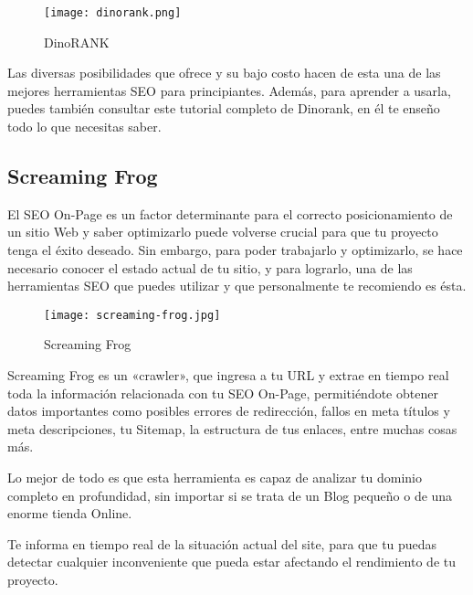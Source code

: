 \begin{figure}[ht!]
    \texttt{[image: dinorank.png]}
    \caption{DinoRANK}
    \label{image-dinorank}
\end{figure}

Las diversas posibilidades que ofrece y su bajo costo hacen de esta una de las mejores herramientas SEO para principiantes. Además, para aprender a usarla, puedes también consultar este tutorial completo de Dinorank, en él te enseño todo lo que necesitas saber.

\subsection{Screaming Frog}

El SEO On-Page es un factor determinante para el correcto posicionamiento de un sitio Web y saber optimizarlo puede volverse crucial para que tu proyecto tenga el éxito deseado. Sin embargo, para poder trabajarlo y optimizarlo, se hace necesario conocer el estado actual de tu sitio, y para lograrlo, una de las herramientas SEO que puedes utilizar y que personalmente te recomiendo es ésta.

\begin{figure}[ht!]
    \texttt{[image: screaming-frog.jpg]}
    \caption{Screaming Frog}
    \label{image-screaming-frog}
\end{figure}

Screaming Frog es un «crawler», que ingresa a tu URL y extrae en tiempo real toda la información relacionada con tu SEO On-Page, permitiéndote obtener datos importantes como posibles errores de redirección, fallos en meta títulos y meta descripciones, tu Sitemap, la estructura de tus enlaces, entre muchas cosas más.

Lo mejor de todo es que esta herramienta es capaz de analizar tu dominio completo en profundidad, sin importar si se trata de un Blog pequeño o de una enorme tienda Online.

Te informa en tiempo real de la situación actual del site, para que tu puedas detectar cualquier inconveniente que pueda estar afectando el rendimiento de tu proyecto.